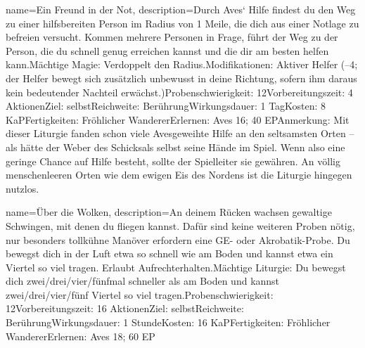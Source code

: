 {
    name={Ein Freund in der Not},
    description={Durch Aves‘ Hilfe findest du den Weg zu einer hilfsbereiten Person im Radius von 1 Meile, die dich aus einer Notlage zu befreien versucht. Kommen mehrere Personen in Frage, führt der Weg zu der Person, die du schnell genug erreichen kannst und die dir am besten helfen kann.\newline Mächtige Magie: Verdoppelt den Radius.\newline Modifikationen: Aktiver Helfer (–4; der Helfer bewegt sich zusätzlich unbewusst in deine Richtung, sofern ihm daraus kein bedeutender Nachteil erwächst.)\newline Probenschwierigkeit: 12\newline Vorbereitungszeit: 4 Aktionen\newline Ziel: selbst\newline Reichweite: Berührung\newline Wirkungsdauer: 1 Tag\newline Kosten: 8 KaP\newline Fertigkeiten: Fröhlicher Wanderer\newline Erlernen: Aves 16; 40 EP\newline Anmerkung: Mit dieser Liturgie fanden schon viele Avesgeweihte Hilfe an den seltsamsten Orten – als hätte der Weber des Schicksals selbst seine Hände im Spiel. Wenn also eine geringe Chance auf Hilfe besteht, sollte der Spielleiter sie gewähren. An völlig menschenleeren Orten wie dem ewigen Eis des Nordens ist die Liturgie hingegen nutzlos. }
}


{
    name={Über die Wolken},
    description={An deinem Rücken wachsen gewaltige Schwingen, mit denen du fliegen kannst. Dafür sind keine weiteren Proben nötig, nur besonders tollkühne Manöver erfordern eine GE- oder Akrobatik-Probe. Du bewegst dich in der Luft etwa so schnell wie am Boden und kannst etwa ein Viertel so viel tragen. Erlaubt Aufrechterhalten.\newline Mächtige Liturgie: Du bewegst dich zwei/drei/vier/fünfmal schneller als am Boden und kannst zwei/drei/vier/fünf Viertel so viel tragen.\newline Probenschwierigkeit: 12\newline Vorbereitungszeit: 16 Aktionen\newline Ziel: selbst\newline Reichweite: Berührung\newline Wirkungsdauer: 1 Stunde\newline Kosten: 16 KaP\newline Fertigkeiten: Fröhlicher Wanderer\newline Erlernen: Aves 18; 60 EP}
}


